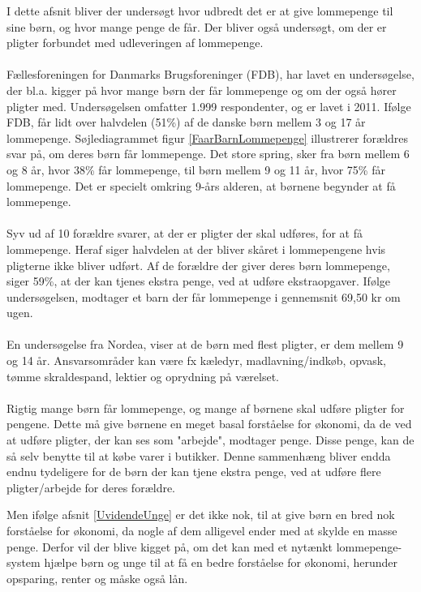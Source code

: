 I dette afsnit bliver der undersøgt hvor udbredt det er at give lommepenge til sine børn, og hvor mange penge de får. Der bliver også undersøgt, om der er pligter forbundet med udleveringen af lommepenge.\\
\\
Fællesforeningen for Danmarks Brugsforeninger (FDB), har lavet en undersøgelse, der bl.a. kigger på hvor mange børn der får lommepenge og om der også hører pligter med. \cite{FDB1} Undersøgelsen omfatter 1.999 respondenter, og er lavet i 2011.
Ifølge FDB, får lidt over halvdelen (51\%) af de danske børn mellem 3 og 17 år lommepenge. Søjlediagrammet figur \ref{FaarBarnLommepenge} illustrerer forældres svar på, om deres børn får lommepenge. Det store spring, sker fra børn mellem 6 og 8 år, hvor 38\% får lommepenge, til børn mellem 9 og 11 år, hvor 75\% får lommepenge. Det er specielt omkring 9-års alderen, at børnene begynder at få lommepenge. \\
\\
Syv ud af 10 forældre svarer, at der er pligter der skal udføres, for at få lommepenge. Heraf siger halvdelen at der bliver skåret i lommepengene hvis pligterne ikke bliver udført. Af de forældre der giver deres børn lommepenge, siger 59\%, at der kan tjenes ekstra penge, ved at udføre ekstraopgaver.
Ifølge undersøgelsen, modtager et barn der får lommepenge i gennemsnit 69,50 kr om ugen.\\
\\
En undersøgelse fra Nordea, viser at de børn med flest pligter, er dem mellem 9 og 14 år. Ansvarsområder kan være fx kæledyr, madlavning/indkøb, opvask, tømme skraldespand, lektier og oprydning på værelset. \cite{Nordea1}\\
\\
Rigtig mange børn får lommepenge, og mange af børnene skal udføre pligter for pengene. Dette må give børnene en meget basal forståelse for økonomi, da de ved at udføre pligter, der kan ses som "arbejde", modtager penge. Disse penge, kan de så selv benytte til at købe varer i butikker. Denne sammenhæng bliver endda endnu tydeligere for de børn der kan tjene ekstra penge, ved at udføre flere pligter/arbejde for deres forældre.

Men ifølge afsnit \ref{UvidendeUnge} er det ikke nok, til at give børn en bred nok forståelse for økonomi, da nogle af dem alligevel ender med at skylde en masse penge. Derfor vil der blive kigget på, om det kan med et nytænkt lommepenge-system hjælpe børn og unge til at få en bedre forståelse for økonomi, herunder opsparing, renter og måske også lån.

